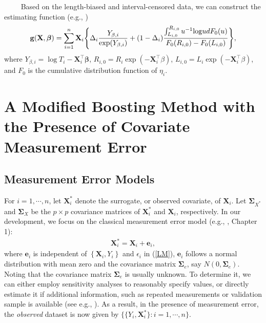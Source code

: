 \begin{description}
{\ \ \ \ } Based on the length-biased and interval-censored data, we can construct the estimating function (e.g., \citealp{ChenQiu:2023})
\begin{eqnarray} \label{eq7}
\mathbf{g}(\mathbf{X},\boldsymbol{\beta}) = \sum_{i=1}^n \mathbf{X}_i \Bigg\{\Delta_i\frac{Y_{\beta,i}}{{\rm exp}(Y_{\beta,i})}+(1-\Delta_i)\frac{\int_{L_{i,0}}^{R_{i,0}} u^{-1}{\rm log}udF_{0}(u)}{F_{0}(R_{i,0})-F_{0}(L_{i,0})} \Bigg\},
\end{eqnarray}
where $Y_{\beta,i}=\log T_i-\mathbf{X}_i^\top \boldsymbol{\beta}$, $R_{i,0}=R_i  \exp(-\mathbf{X}_i^\top\beta)$, $L_{i,0}=L_i \exp(-\mathbf{X}_i^\top\beta)$, and $F_{0}$ is the cumulative distribution function of $\eta_i$.

\end{description}



\section{A Modified Boosting Method with the Presence of Covariate Measurement Error} \label{Main-Result}


\subsection{Measurement Error Models} 
 
For $i=1,\cdots,n$, let $\mathbf{X}_i^\ast$ denote the surrogate, or observed covariate, of $\mathbf{X}_i$. Let $\boldsymbol{\Sigma}_{X^\ast}$ and $\boldsymbol{\Sigma}_X$ be the $p \times p$ covariance matrices of $\mathbf{X}_i^\ast$ and $\mathbf{X}_i$, respectively. In our development, we focus on the classical measurement error model (e.g., \citealp{Carroll:2006}, Chapter 1):
\begin{eqnarray} \label{mea_classic}
\mathbf{X}_i^\ast =  \mathbf{X}_i + \mathbf{e}_i,
\end{eqnarray}
where $\mathbf{e}_i$ is independent of $\left\{\mathbf{X}_i, Y_i \right\}$ and  $\epsilon_i$ in (\ref{LM}), $\mathbf{e}_i$ follows a normal distribution with mean zero and the covariance matrix $\boldsymbol{\Sigma}_e$, say $N(0,\boldsymbol{\Sigma}_e)$. Noting that the covariance matrix $\boldsymbol{\Sigma}_e$ is usually unknown. To determine it, we can either employ sensitivity analyses to reasonably specify values, or directly estimate it if additional information, such as repeated measurements or validation sample is available ({see} e.g., \citealp{ChenYi:2021}). As a result, in the presence of measurement error, the {\em observed} dataset is now given by $\big\{ \{Y_i, \mathbf{X}_i^\ast\} : i=1,\cdots,n\big\}$.



